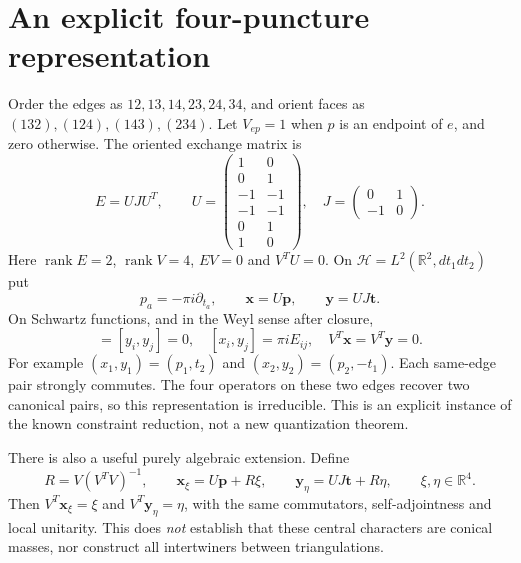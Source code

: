 \documentclass[11pt,a4paper]{article}
\newcommand{\HH}{\mathcal H}
\begin{document}
\section{An explicit four-puncture representation}
Order the edges as $12,13,14,23,24,34$, and orient faces as
$(132),(124),(143),(234)$. Let $V_{ep}=1$ when $p$ is an endpoint
of $e$, and zero otherwise. The oriented exchange matrix is
\begin{equation}
 E=UJU^T,\qquad
 U=\begin{pmatrix}1&0\\0&1\\-1&-1\\-1&-1\\0&1\\1&0\end{pmatrix},
 \quad J=\begin{pmatrix}0&1\\-1&0\end{pmatrix}.
\end{equation}
Here $\operatorname{rank}E=2$, $\operatorname{rank}V=4$,
$EV=0$ and $V^TU=0$. On
$\HH=L^2(\mathbb R^2,dt_1dt_2)$ put
\begin{equation}
 p_a=-\pi i\partial_{t_a},\qquad
 \mathbf x=U\mathbf p,\qquad \mathbf y=UJ\mathbf t.
 \label{rep}
\end{equation}
On Schwartz functions, and in the Weyl sense after closure,
\begin{equation}
 [x_i,x_j]=[y_i,y_j]=0,\quad
 [x_i,y_j]=\pi iE_{ij},\quad
 V^T\mathbf x=V^T\mathbf y=0.
\end{equation}
For example $(x_1,y_1)=(p_1,t_2)$ and
$(x_2,y_2)=(p_2,-t_1)$. Each same-edge pair strongly commutes.
The four operators on these two edges recover two canonical pairs,
so this representation is irreducible. This is an explicit instance
of the known constraint reduction, not a new quantization theorem.

There is also a useful purely algebraic extension. Define
\begin{equation}
 R=V(V^TV)^{-1},\qquad
 \mathbf x_\xi=U\mathbf p+R\xi,\qquad
 \mathbf y_\eta=UJ\mathbf t+R\eta,\qquad \xi,\eta\in\mathbb R^4.
\end{equation}
Then $V^T\mathbf x_\xi=\xi$ and $V^T\mathbf y_\eta=\eta$,
with the same commutators, self-adjointness and local unitarity.
This does \emph{not} establish that these central characters are
conical masses, nor construct all intertwiners between triangulations.
\end{document}
